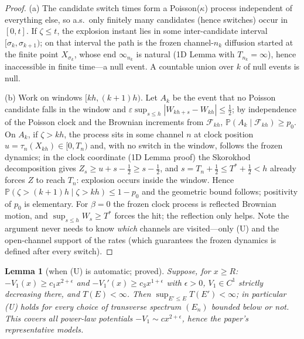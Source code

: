 \documentclass[11pt]{article}
\newtheorem{lemma}[theorem]{Lemma}
\theoremstyle{remark}
\newcommand{\Prob}{\mathbb{P}}
\begin{document}
\begin{proof}
(a)  The candidate switch times form a Poisson($\kappa$) process
independent of everything else, so a.s.\ only finitely many candidates
(hence switches) occur in $[0,t]$.  If $\zeta\le t$, the explosion
instant lies in some inter-candidate interval $[\sigma_{k},
\sigma_{k+1})$; on that interval the path is the frozen channel-$n_k$
diffusion started at the finite point $X_{\sigma_{k}}$, whose end
$\infty_{n_{k}}$ is natural (1D Lemma with $T_{n_{k}}=\infty$), hence
inaccessible in finite time---a null event.  A countable union over $k$
of null events is null.

(b)  Work on windows $[kh,(k+1)h)$.  Let $A_{k}$ be the event
that no Poisson candidate falls in the window and
$\varepsilon\sup_{s\le h}|W_{kh+s}-W_{kh}|\le\tfrac12$;
by independence of the Poisson clock and the Brownian increments from
$\mathcal F_{kh}$, $\Prob(A_{k}\mid\mathcal F_{kh})\ge p_{0}$.  On
$A_{k}$, if $\zeta>kh$, the process sits in some channel $n$ at clock
position $u=\tau_{n}(X_{kh})\in[0,T_{n})$ and, with no switch in the
window, follows the frozen dynamics; in the clock coordinate
(1D Lemma proof) the Skorokhod decomposition gives
$Z_{s}\ge u+s-\tfrac12\ge s-\tfrac12$, and
$s=T_{n}+\tfrac12\le T^{*}+\tfrac12<h$ already forces $Z$ to reach
$T_{n}$: explosion occurs inside the window.  Hence
$\Prob(\zeta>(k+1)h\mid\zeta>kh)\le1-p_{0}$ and the geometric bound
follows; positivity of $p_{0}$ is elementary.  For $\beta=0$ the frozen
clock process is reflected Brownian motion, and
$\sup_{s\le h}W_{s}\ge T^{*}$ forces the hit; the reflection only
helps.  Note the argument never needs to know \emph{which} channels are
visited---only (U) and the open-channel support of the rates (which
guarantees the frozen dynamics is defined after every switch).
\end{proof}

\begin{lemma}[when (U) is automatic; proved]\label{lem:U}
Suppose, for $x\ge R$: $-V_{1}(x)\ge c_{1}x^{2+\epsilon}$ and
$-V_{1}'(x)\ge c_{3}x^{1+\epsilon}$ with $\epsilon>0$, $V_{1}\in C^{1}$
strictly decreasing there, and $T(E)<\infty$.  Then
$\sup_{E'\le E}T(E')<\infty$; in particular (U) holds for every choice
of transverse spectrum $(E_{n})$ bounded below or not.  This covers all
power-law potentials $-V_{1}\sim cx^{2+\epsilon}$, hence the paper's
representative models.
\end{lemma}
\end{document}
